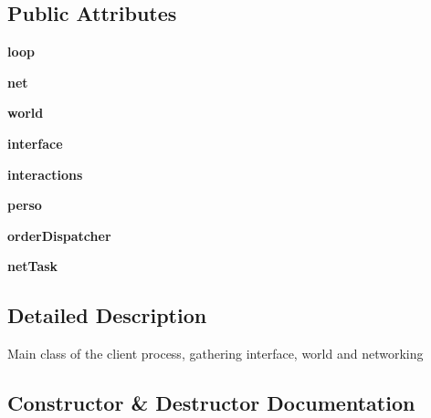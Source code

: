 \subsection*{Public Attributes}
\begin{DoxyCompactItemize}
\item 
\hypertarget{classsrc_1_1client_1_1_client_a48d0ff4eb05742f386a42b0a4f56487e}{}\label{classsrc_1_1client_1_1_client_a48d0ff4eb05742f386a42b0a4f56487e} 
{\bfseries loop}
\item 
\hypertarget{classsrc_1_1client_1_1_client_ab306933e55922a615cac60aa047a48e6}{}\label{classsrc_1_1client_1_1_client_ab306933e55922a615cac60aa047a48e6} 
{\bfseries net}
\item 
\hypertarget{classsrc_1_1client_1_1_client_a32002e2bcc80bdbf13d1e36b7f40892c}{}\label{classsrc_1_1client_1_1_client_a32002e2bcc80bdbf13d1e36b7f40892c} 
{\bfseries world}
\item 
\hypertarget{classsrc_1_1client_1_1_client_afaa6a1a13d9b3d85977393d595bea9f2}{}\label{classsrc_1_1client_1_1_client_afaa6a1a13d9b3d85977393d595bea9f2} 
{\bfseries interface}
\item 
\hypertarget{classsrc_1_1client_1_1_client_a020e87b609538f523950e204192929fd}{}\label{classsrc_1_1client_1_1_client_a020e87b609538f523950e204192929fd} 
{\bfseries interactions}
\item 
\hypertarget{classsrc_1_1client_1_1_client_a027529883defe2a2f0c4b60230e454a1}{}\label{classsrc_1_1client_1_1_client_a027529883defe2a2f0c4b60230e454a1} 
{\bfseries perso}
\item 
\hypertarget{classsrc_1_1client_1_1_client_a281c935d657590486805218213148ba5}{}\label{classsrc_1_1client_1_1_client_a281c935d657590486805218213148ba5} 
{\bfseries order\+Dispatcher}
\item 
\hypertarget{classsrc_1_1client_1_1_client_aa8c68e1e064496811c40de603982cc43}{}\label{classsrc_1_1client_1_1_client_aa8c68e1e064496811c40de603982cc43} 
{\bfseries net\+Task}
\end{DoxyCompactItemize}


\subsection{Detailed Description}
\begin{DoxyVerb}Main class of the client process, gathering interface, world and networking\end{DoxyVerb}
 

\subsection{Constructor \& Destructor Documentation}
\hypertarget{classsrc_1_1client_1_1_client_ad06816480ed00d1c26c21be499a9d0ec}{}\label{classsrc_1_1client_1_1_client_ad06816480ed00d1c26c21be499a9d0ec} 

